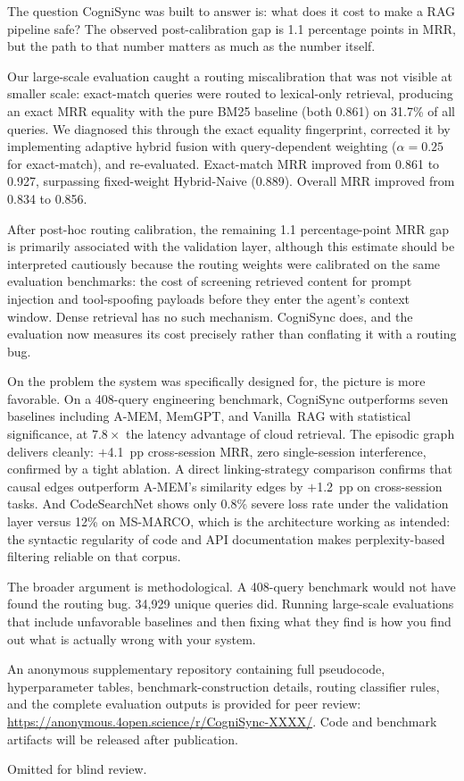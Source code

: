 \documentclass[sigconf]{acmart}
\begin{document}
The question CogniSync was built to answer is: what does it cost to make
a RAG pipeline safe? The observed post-calibration gap is 1.1 percentage points in MRR, but the path to that number matters as much
as the number itself.

Our large-scale evaluation caught a routing miscalibration that was not
visible at smaller scale: exact-match queries were routed to lexical-only
retrieval, producing an exact MRR equality with the pure BM25 baseline
(both 0.861) on 31.7\% of all queries. We diagnosed this through the
exact equality fingerprint, corrected it by implementing adaptive hybrid
fusion with query-dependent weighting ($\alpha = 0.25$ for exact-match),
and re-evaluated. Exact-match MRR improved from 0.861 to 0.927, surpassing
fixed-weight Hybrid-Naive (0.889). Overall MRR improved from 0.834 to 0.856.

After post-hoc routing calibration, the remaining 1.1 percentage-point
MRR gap is primarily associated with the validation layer, although this
estimate should be interpreted cautiously because the routing weights
were calibrated on the same evaluation benchmarks: the cost of screening retrieved content for prompt
injection and tool-spoofing payloads before they enter the agent's context
window. Dense retrieval has no such mechanism. CogniSync does, and the
evaluation now measures its cost precisely rather than conflating it with
a routing bug.

On the problem the system was specifically designed for, the picture is
more favorable. On a 408-query engineering benchmark, CogniSync outperforms
seven baselines including A-MEM, MemGPT, and Vanilla~RAG with statistical
significance, at $7.8\times$ the latency advantage of cloud retrieval. The
episodic graph delivers cleanly: $+$4.1~pp cross-session MRR, zero
single-session interference, confirmed by a tight ablation. A direct
linking-strategy comparison confirms that causal edges outperform A-MEM's
similarity edges by $+$1.2~pp on cross-session tasks. And CodeSearchNet
shows only 0.8\% severe loss rate under the validation layer versus 12\%
on MS-MARCO, which is the architecture working as intended: the syntactic
regularity of code and API documentation makes perplexity-based filtering
reliable on that corpus.

The broader argument is methodological. A 408-query benchmark would not
have found the routing bug. 34,929 unique queries did. Running large-scale
evaluations that include unfavorable baselines and then fixing what
they find is how you find out what is actually wrong with your system.

An anonymous supplementary repository containing full pseudocode,
hyperparameter tables, benchmark-construction details, routing classifier
rules, and the complete evaluation outputs is provided for peer review:
\url{https://anonymous.4open.science/r/CogniSync-XXXX/}.
Code and benchmark artifacts will be released after publication.

\begin{acks}
Omitted for blind review.
\end{acks}




\end{document}
